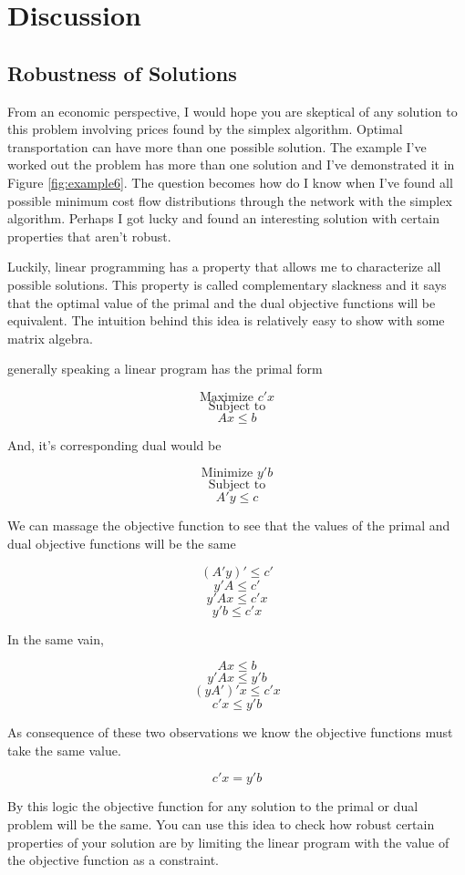 \documentclass{report}
\begin{document}
\chapter{Discussion}

\section{Robustness of Solutions}

From an economic perspective, I would hope you are skeptical of any solution to this problem involving prices found by the simplex algorithm. Optimal transportation can have more than one possible solution. The example I've worked out the problem  has more than one solution and I've demonstrated it in Figure \ref{fig:example6}. The question becomes how do I know when I've found all possible minimum cost flow distributions through the network with the simplex algorithm. Perhaps I got lucky and found an interesting solution with certain properties that aren't robust.

Luckily, linear programming has a property that allows me to characterize all possible solutions. This property is called complementary slackness and it says that the optimal value of the primal and the dual objective functions will be equivalent. The intuition behind this idea is relatively easy to show with some matrix algebra.

 generally speaking a linear program has the primal form

$$\text{Maximize } c' x$$
$$\text{Subject to}$$
$$Ax \leq b$$

And, it's corresponding dual would be

$$\text{Minimize } y' b$$
$$\text{Subject to}$$
$$A'y \leq c$$

We can massage the objective function to see that the values of the primal and dual objective functions will be the same

$$(A'y)' \leq c'$$
$$ y'A \leq c'$$
$$ y'Ax \leq c'x$$
$$y' b \leq c'x$$

In the same vain, 

$$ Ax \leq b$$
$$ y'Ax \leq y'b$$
$$ (yA')'x \leq c'x$$
$$ c'x \leq  y' b $$

As consequence of these two observations we know the objective functions must take the same value.

$$c'x = y' b$$

By this logic the objective function for any solution to the primal or dual problem will be the same. You can use this idea to check how robust certain properties of your solution are by limiting the linear program with the value of the objective function as a constraint. 
\end{document}
